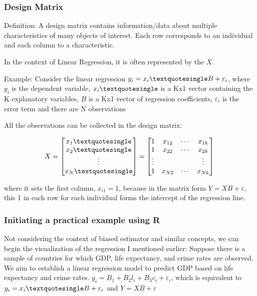 \documentclass{article} %
\begin{document}
\subsubsection{Design Matrix}
Definition: A design matrix contains information/data about multiple characteristics of many objects of interest. 
Each row corresponds to an individual and each column to a characteristic.

In the context of Linear Regression, it is often represented by the \(X\).

Example: Consider the linear regression \(y_i = x_i\textquotesingle B + \varepsilon_i\), where \(y_i\) is the dependent variable, \(x_i\textquotesingle\) is a Kx1 vector containing the K explanatory variables, \(B\) is a Kx1 vector of regression coefficients, \(\varepsilon_i\) is the error term and there are N observations

All the observations can be collected in the design matrix:


\[X = \begin{bmatrix} x_1\textquotesingle\\x_2\textquotesingle\\\vdots\\x_N\textquotesingle\end{bmatrix} = \begin{bmatrix}
1 & x_{12} & \cdots & x_{1k} \\
1 & x_{22} & \cdots & x_{2k} \\
\vdots & & & \vdots \\
1 & x_{N2} & \cdots & x_{Nk}
\end{bmatrix}\]

where it sets the first column, \(x_{i1} = 1\), because in the matrix form \(Y = XB + \varepsilon\), this 1 in each row for each individual forms the intercept of the regression line.

\subsubsection{Initiating a practical example using R}
Not considering the context of biased estimator and similar concepts, we can begin the visualization of the regression I mentioned earlier:
Suppose there is a sample of countries for which GDP, life expectancy, and crime rates are observed. We aim to establish a linear regression model to predict GDP based on life expectancy and crime rates.
\(g_i = B_1 + B_2l_i + B_3c_i + \varepsilon_i \), which is equivalent to \(y_i = x_i\textquotesingle B + \varepsilon_i\) and \(Y = XB + \varepsilon\)
\end{document}
